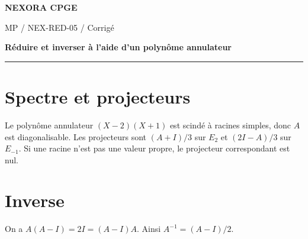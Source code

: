 \documentclass[11pt,a4paper]{article}
\begin{document}
{\small\bfseries\color{nexorablue} NEXORA CPGE}\par
{\small MP / NEX-RED-05 / Corrigé}\par
{\LARGE\bfseries Réduire et inverser à l’aide d’un polynôme annulateur}\par
\vspace{0.25em}\hrule\vspace{0.6em}

\section*{Spectre et projecteurs}
Le polynôme annulateur $(X-2)(X+1)$ est scindé à racines simples, donc $A$ est diagonalisable. Les projecteurs sont $(A+I)/3$ sur $E_2$ et $(2I-A)/3$ sur $E_{-1}$. Si une racine n’est pas une valeur propre, le projecteur correspondant est nul.

\section*{Inverse}
On a $A(A-I)=2I=(A-I)A$. Ainsi $A^{-1}=(A-I)/2$.
\end{document}
